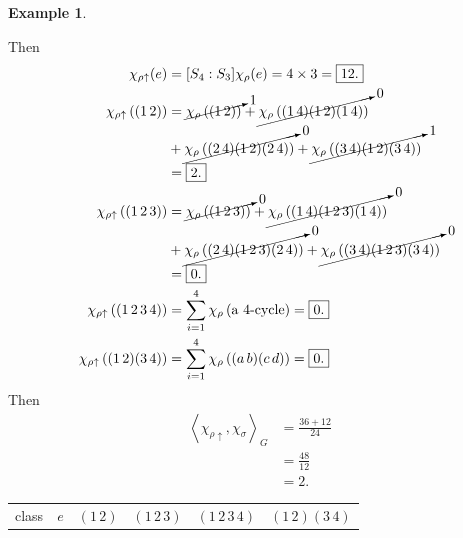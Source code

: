 \documentclass[12pt]{article}
\newcommand{\vbrack}[1]{\left \langle #1 \right \rangle}
\theoremstyle{definition}
\newtheorem{example}{Example}[section]
\begin{document}
\begin{example}
\begin{itemize}
\begin{equation}
        \end{equation}
        Then 
        \begin{equation}
            \begin{split}
                \chi_{\rho \uparrow}(e) & = [S_4 : S_3] \chi_{\rho}(e) = 4 \times 3 = \boxed{12.} \\
                \chi_{\rho \uparrow} \left( (1\,2) \right) & = \cancelto{1}{\chi_{\rho} \left( (1\,2) \right)} + \cancelto{0}{\chi_{\rho} \left( (1\,4)(1\,2)(1\,4) \right)} \\
                & + \cancelto{0}{\chi_{\rho} \left( (2\,4)(1\,2)(2\,4) \right)} + \cancelto{1}{\chi_{\rho} \left( (3\,4)(1\,2)(3\,4) \right)} \\
                & = \boxed{2.} \\
                \chi_{\rho \uparrow} \left( (1\,2\,3) \right) & = \cancelto{0}{\chi_{\rho} \left( (1\,2\,3) \right)} + \cancelto{0}{\chi_{\rho} \left( (1\,4)(1\,2\,3)(1\,4) \right)} \\
                & + \cancelto{0}{\chi_{\rho} \left( (2\,4)(1\,2\,3)(2\,4) \right)} + \cancelto{0}{\chi_{\rho} \left( (3\,4)(1\,2\,3)(3\,4) \right)} \\
                & = \boxed{0.} \\
                \chi_{\rho \uparrow} \left( (1\,2\,3\,4) \right) & = \sum\limits_{i = 1}^4 \chi_{\rho} \left( \text{a 4-cycle} \right) = \boxed{0.} \\
                \chi_{\rho \uparrow} \left( (1\,2)(3\,4) \right) & = \sum\limits_{i = 1}^4 \chi_{\rho} \left( (a\,b)(c\,d) \right) = \boxed{0.}
            \end{split}
        \end{equation}
        Then 
        \begin{equation}
            \begin{split}
                \vbrack{\chi_{\rho \uparrow} , \chi_{\sigma}}_G & = \frac{36 + 12}{24} \\
                & = \frac{48}{12} \\
                & = \boxed{2.}
            \end{split}
        \end{equation}
        \begin{table}[H]
            \centering
            \begin{tabular}{|| c | c | c | c | c | c ||}
                \hline
                class & $e$ & $(1\,2)$ & $(1\,2\,3)$ & $(1\,2\,3\,4)$ & $(1\,2)(3\,4)$ \\

\end{tabular}
\end{table}
\end{itemize}
\end{example}
\end{document}
